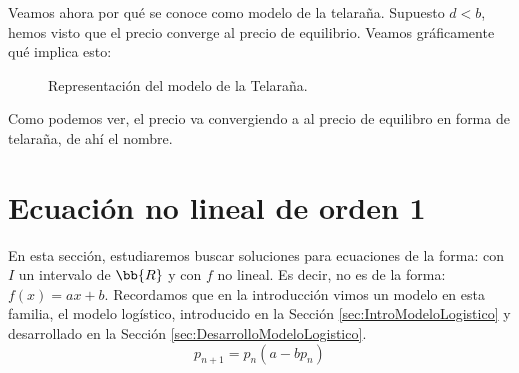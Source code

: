 Veamos ahora por qué se conoce como modelo de la telaraña. Supuesto $d<b$, hemos visto que el precio converge al precio de equilibrio. Veamos gráficamente qué implica esto:
\begin{figure}[H]
    \centering
    \caption{Representación del modelo de la Telaraña.}
\end{figure}
Como podemos ver, el precio va convergiendo a al precio de equilibro en forma de telaraña, de ahí el nombre.

\section{Ecuación no lineal de orden 1}
En esta sección, estudiaremos buscar soluciones para ecuaciones de la forma:
con $I$ un intervalo de $\bb{R}$ y con $f$ no lineal. Es decir, no es de la forma: $f(x) = ax +b$. Recordamos que en la introducción vimos un modelo en esta familia, el modelo logístico, introducido en la Sección \ref{sec:IntroModeloLogistico} y desarrollado en la Sección \ref{sec:DesarrolloModeloLogistico}.
\begin{equation*}
    p_{n+1} = p_n(a-bp_n)
\end{equation*}

